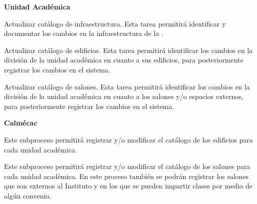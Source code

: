 \begin{PDescripcion}
	
\Ppaso \textbf{Unidad Académica} 
	\begin{enumerate}
		
		\Ppaso[\PSubProceso]  {Actualizar catálogo de infraestructura.} Esta tarea permitirá identificar y documentar los cambios en la infraestructura de la .

		\Ppaso[\PSubProceso]  {Actualizar catálogo de edificios.} Esta tarea permitirá identificar los cambios en la división de la unidad académica en cuanto a sus edificios, para posteriormente registrar los cambios en el sistema.
		
		\Ppaso[\PSubProceso]  {Actualizar catálogo de salones.} Esta tarea permitirá identificar los cambios en la división de la unidad académica en cuanto a los salones y/o espacios externos, para posteriormente registrar los cambios en el sistema.	
	\end{enumerate}

\Ppaso \textbf{Calmécac}

	\begin{enumerate}
		
		\Ppaso[\PSubProceso]  Este subproceso permitirá registrar y/o modificar el catálogo de los edificios para cada unidad académica.
		
		\Ppaso[\PSubProceso]  Este subproceso permitirá registrar y/o modificar el catálogo de los salones para cada unidad académica. En este proceso también se podrán registrar los salones que son externos al Instituto y en los que se pueden impartir clases por medio de algún convenio.
		
	\end{enumerate}
	
	
	
\end{PDescripcion}






